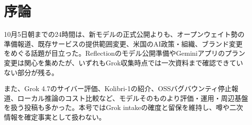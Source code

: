 \section*{序論}
10月5日朝までの24時間は、新モデルの正式公開よりも、オープンウェイト勢の準備報道、既存サービスの提供範囲変更、米国のAI政策・組織、ブランド変更をめぐる話題が目立った。Reflectionのモデル公開準備やGeminiアプリのプラン変更は関心を集めたが、いずれもGrok収集時点では一次資料まで確認できていない部分が残る。

また、Grok 4.7のサイバー評価、Kolibri-1の紹介、OSSバグバウンティ停止報道、ローカル推論のコスト比較など、モデルそのものより評価・運用・周辺基盤を扱う投稿も多かった。本号ではGrok intakeの確度と留保を維持し、噂や二次情報を確定事実として扱わない。
